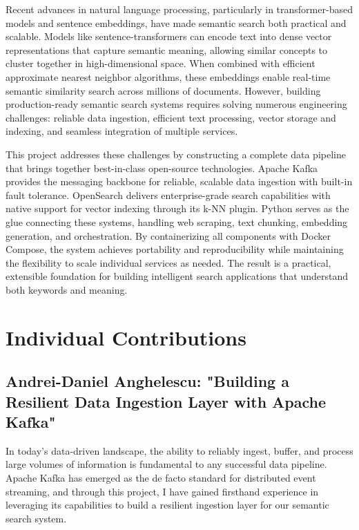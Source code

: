 \documentclass[12pt, a4paper]{article}
\begin{document}
Recent advances in natural language processing, particularly in transformer-based models and sentence embeddings, have made semantic search both practical and scalable. Models like sentence-transformers can encode text into dense vector representations that capture semantic meaning, allowing similar concepts to cluster together in high-dimensional space. When combined with efficient approximate nearest neighbor algorithms, these embeddings enable real-time semantic similarity search across millions of documents. However, building production-ready semantic search systems requires solving numerous engineering challenges: reliable data ingestion, efficient text processing, vector storage and indexing, and seamless integration of multiple services.

This project addresses these challenges by constructing a complete data pipeline that brings together best-in-class open-source technologies. Apache Kafka provides the messaging backbone for reliable, scalable data ingestion with built-in fault tolerance. OpenSearch delivers enterprise-grade search capabilities with native support for vector indexing through its k-NN plugin. Python serves as the glue connecting these systems, handling web scraping, text chunking, embedding generation, and orchestration. By containerizing all components with Docker Compose, the system achieves portability and reproducibility while maintaining the flexibility to scale individual services as needed. The result is a practical, extensible foundation for building intelligent search applications that understand both keywords and meaning.

\newpage
\section{Individual Contributions}

\subsection{Andrei-Daniel Anghelescu: "Building a Resilient Data Ingestion Layer with Apache Kafka"}

In today's data-driven landscape, the ability to reliably ingest, buffer, and process large volumes of information is fundamental to any successful data pipeline. Apache Kafka has emerged as the de facto standard for distributed event streaming, and through this project, I have gained firsthand experience in leveraging its capabilities to build a resilient ingestion layer for our semantic search system.
\end{document}
